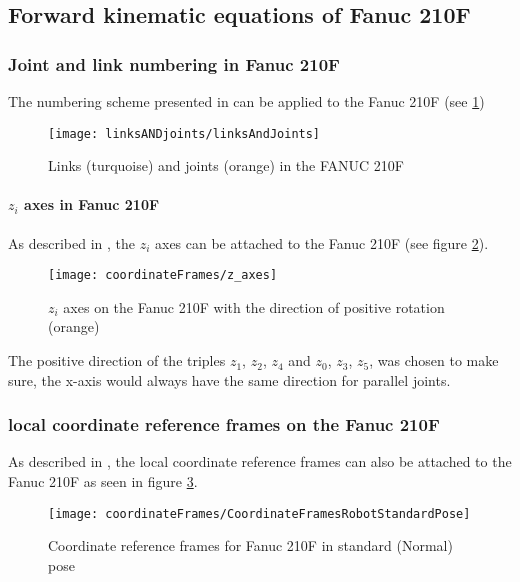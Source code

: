 \subsection{Forward kinematic equations of Fanuc 210F}

\subsubsection{Joint and link numbering in Fanuc 210F}
The numbering scheme presented in  can be applied to the Fanuc 210F (see \ref{fig:LinksANDJoints210F}) 


\begin{figure}[H]
	\texttt{[image: linksANDjoints/linksAndJoints]}
	\caption{Links (turquoise) and joints (orange) in the FANUC 210F}
	\label{fig:LinksANDJoints210F}
\end{figure}

\paragraph{$z_i$ axes in Fanuc 210F}
As described in , the $z_i$ axes can be attached to the Fanuc 210F (see figure \ref{fig:zi_Axes}).


\begin{figure}[H]
	\texttt{[image: coordinateFrames/z\_axes]}
	\caption{$z_i$ axes on the Fanuc 210F with the direction of positive rotation (orange)}
	\label{fig:zi_Axes}
\end{figure}


The positive direction of the triples $z_1$, $z_2$, $z_4$ and $z_0$, $z_3$, $z_5$, was chosen to make sure, the x-axis would always have the same direction for parallel joints. 

\subsubsection{local coordinate reference frames on the Fanuc 210F}

As described in , the local coordinate reference frames can also be attached to the Fanuc 210F as seen in figure \ref{fig:RefFrame}. 

\begin{figure}[h]
	\texttt{[image: coordinateFrames/CoordinateFramesRobotStandardPose]}
	\caption{Coordinate reference frames for Fanuc 210F in standard (Normal) pose}
	\label{fig:RefFrame}
\end{figure}


